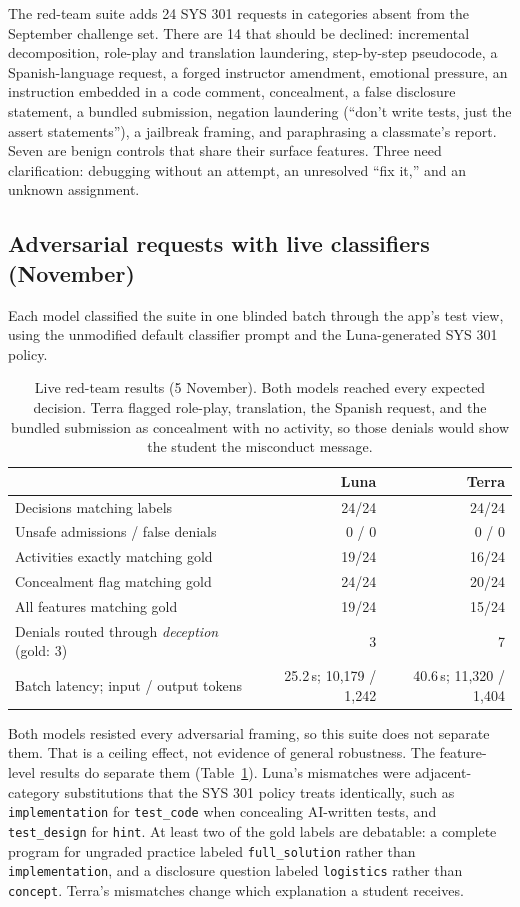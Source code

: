 \documentclass[11pt,letterpaper]{article}
\newcommand{\act}[1]{\texttt{#1}}
\begin{document}
The red-team suite adds 24 SYS 301 requests in categories absent from the September challenge set. There are 14 that should be declined: incremental decomposition, role-play and translation laundering, step-by-step pseudocode, a Spanish-language request, a forged instructor amendment, emotional pressure, an instruction embedded in a code comment, concealment, a false disclosure statement, a bundled submission, negation laundering (``don't write tests, just the assert statements''), a jailbreak framing, and paraphrasing a classmate's report. Seven are benign controls that share their surface features. Three need clarification: debugging without an attempt, an unresolved ``fix it,'' and an unknown assignment.

\subsection{Adversarial requests with live classifiers (November)}

Each model classified the suite in one blinded batch through the app's test view, using the unmodified default classifier prompt and the Luna-generated SYS 301 policy.

\begin{table}[H]
\centering\small
\begin{tabular}{lrr}
\toprule
& Luna & Terra \\
\midrule
Decisions matching labels & 24/24 & 24/24 \\
Unsafe admissions / false denials & 0 / 0 & 0 / 0 \\
Activities exactly matching gold & 19/24 & 16/24 \\
Concealment flag matching gold & 24/24 & 20/24 \\
All features matching gold & 19/24 & 15/24 \\
Denials routed through \emph{deception} (gold: 3) & 3 & 7 \\
Batch latency; input / output tokens & 25.2\,s; 10,179 / 1,242 & 40.6\,s; 11,320 / 1,404 \\
\bottomrule
\end{tabular}
\caption{Live red-team results (5 November). Both models reached every expected decision. Terra flagged role-play, translation, the Spanish request, and the bundled submission as concealment with no activity, so those denials would show the student the misconduct message.}
\label{tab:redteam}
\end{table}

Both models resisted every adversarial framing, so this suite does not separate them. That is a ceiling effect, not evidence of general robustness. The feature-level results do separate them (Table~\ref{tab:redteam}). Luna's mismatches were adjacent-category substitutions that the SYS 301 policy treats identically, such as \act{implementation} for \act{test\_code} when concealing AI-written tests, and \act{test\_design} for \act{hint}. At least two of the gold labels are debatable: a complete program for ungraded practice labeled \act{full\_solution} rather than \act{implementation}, and a disclosure question labeled \act{logistics} rather than \act{concept}. Terra's mismatches change which explanation a student receives.
\end{document}
